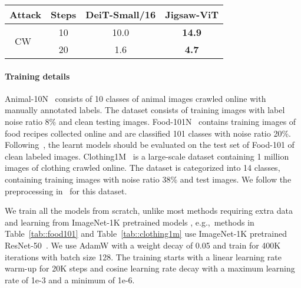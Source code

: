 \documentclass{article}
\begin{document}
\begin{table}[t]
\begin{minipage}{0.4\textwidth}
{{            \begin{tabular}{c|c||cc}
            Attack & Steps & DeiT-Small/16 & Jigsaw-ViT 
            \\ \hline
            \multicolumn{1}{c|}{\multirow{2}{*}{CW~\cite{carlini2017towards}}}
            & 10 & 10.0
            & {\bf 14.9} \textcolor{ForestGreen}{}
            \\
            & 20 & 1.6
            & {\bf 4.7} \textcolor{ForestGreen}{}
            \\ \bottomrule[0.75pt]
            \end{tabular}
            \label{tab::l2}}}
    \end{minipage}\hfill
    \label{tab::white-box}
\end{table}


\paragraph{Training details} 
Animal-10N~\cite{song2019selfie} consists of 10 classes of animal images crawled online with manually annotated labels. 
The dataset consists of  training images with label noise ratio 8\% and  clean testing images. 
Food-101N~\cite{lee2018cleannet} contains  training images of food recipes collected online and are classified 101 classes with noise ratio 20\%. 
Following~\cite{lee2018cleannet}, the learnt models should be evaluated on the test set of Food-101 of  clean labeled images. 
Clothing1M~\cite{xiao2015learning} is a large-scale dataset containing 1 million images of clothing crawled online. 
The dataset is categorized into 14 classes, containing  training images with noise ratio 38\% and  test images. 
We follow the preprocessing in~\cite{zhang2021learning,chen2022compressing} for this dataset.

We train all the models from scratch, unlike most methods requiring extra data and learning from ImageNet{-1K} pretrained models \cite{liu2020early,li2020dividemix,zhang2021learning,feng2021s3}, e.g.,~methods in Table~\ref{tab::food101} and Table~\ref{tab::clothing1m} use ImageNet{-1K} pretrained ResNet-50~\cite{he2016deep}.
We use AdamW with a weight decay of 0.05 and train for 400K iterations with batch size 128. 
The training starts with a linear learning rate warm-up for 20{K} steps and cosine learning rate decay with a maximum learning rate of 1e-3 and a minimum of 1e-6.
\end{document}
